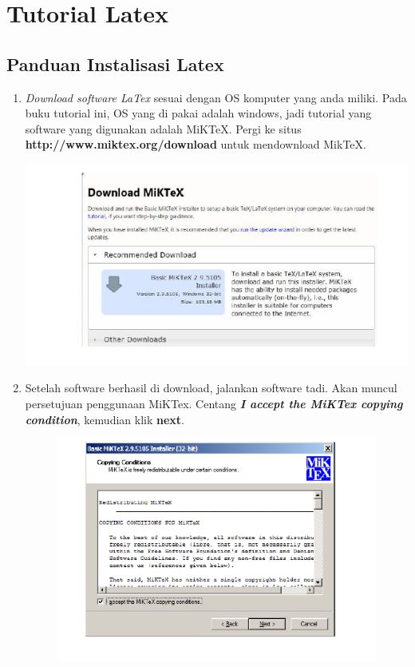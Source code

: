 \chapter{Tutorial Latex}
\section{Panduan Instalisasi Latex}
\begin{enumerate}
\item {\itshape Download software LaTex} sesuai dengan OS komputer yang anda miliki. Pada buku tutorial ini, OS yang di pakai adalah windows, jadi tutorial yang software yang digunakan adalah MiKTeX. Pergi ke situs {\bf http://www.miktex.org/download} untuk mendownload MikTeX.
\begin{center}
	\includegraphics[width =10 cm]{img/18.png}
	\label{picture label}
\end{center}
\item Setelah software berhasil di download, jalankan software tadi. Akan muncul persetujuan penggunaan MiKTex. Centang {\bf \itshape{I accept the MiKTex copying condition}}, kemudian klik {\bf next}.
\begin{figure}[h!]
    \centering
    \includegraphics[width =10 cm]{img/19.png}
	\label{picture label}
\end{figure}

\end{enumerate}
